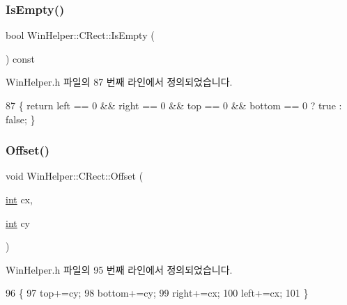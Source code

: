 \subsubsection{\texorpdfstring{Is\+Empty()}{IsEmpty()}}
{\footnotesize\ttfamily bool Win\+Helper\+::\+C\+Rect\+::\+Is\+Empty (\begin{DoxyParamCaption}{ }\end{DoxyParamCaption}) const\hspace{0.3cm}{\ttfamily [inline]}}



Win\+Helper.\+h 파일의 87 번째 라인에서 정의되었습니다.


\begin{DoxyCode}
87 \{ \textcolor{keywordflow}{return} left == 0 && right == 0 && top == 0 && bottom == 0 ? true : \textcolor{keyword}{false}; \}
\end{DoxyCode}
\mbox{\label{class_win_helper_1_1_c_rect_ab241031d5051b5fa34594cd83fa93534}} 
\subsubsection{\texorpdfstring{Offset()}{Offset()}}
{\footnotesize\ttfamily void Win\+Helper\+::\+C\+Rect\+::\+Offset (\begin{DoxyParamCaption}\item[{\mbox{\hyperlink{_util_8cpp_a0ef32aa8672df19503a49fab2d0c8071}{int}}}]{cx,  }\item[{\mbox{\hyperlink{_util_8cpp_a0ef32aa8672df19503a49fab2d0c8071}{int}}}]{cy }\end{DoxyParamCaption})\hspace{0.3cm}{\ttfamily [inline]}}



Win\+Helper.\+h 파일의 95 번째 라인에서 정의되었습니다.


\begin{DoxyCode}
96         \{
97           top+=cy;
98           bottom+=cy;
99           right+=cx;
100           left+=cx;
101         \}
\end{DoxyCode}
\mbox{\label{class_win_helper_1_1_c_rect_a744e3b6f0a33e7143dbe852d71190875}} 
